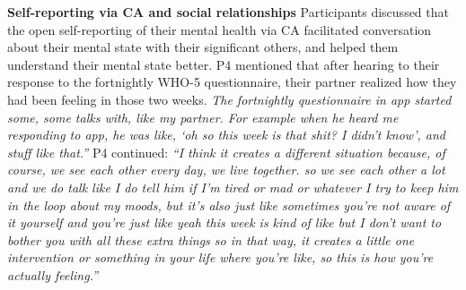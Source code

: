         
        

        
   

            
            
    \textbf{Self-reporting via \ac{CA} and social relationships}    
        Participants discussed that the open self-reporting of their mental health via \ac{CA} 
        facilitated conversation about their mental state with their significant others, 
        and helped them understand their mental state better.
        P4 mentioned that after hearing to their response to the fortnightly \ac{WHO-5} questionnaire, their partner realized how they had been feeling in those two weeks.
            \textit{ The fortnightly questionnaire in \acl{app} started some, some talks with, like my partner. For example when he heard me responding to \acl{app}, he was like, `oh so this week is that shit? I didn't know', and stuff like that.''}
        P4 continued:
            \textit{``I think it creates a different situation because, of course, we see each other every day, we live together. 
            so we see each other a lot and we do talk like I do tell him if I'm tired or mad or whatever I try to keep him in the loop about my moods, but it's also just like sometimes you're not aware of it yourself and you're just like yeah this week is kind of like but I don't want to bother you with all these extra things so in that way, it creates a little one intervention or something in your life where you're like, so this is how you're actually feeling.''} 
